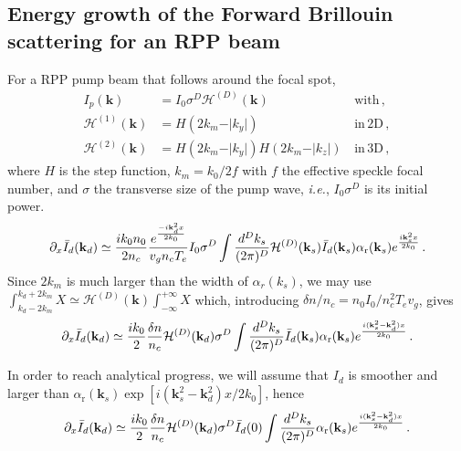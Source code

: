 \documentclass[
 reprint,
 amsmath,amssymb,
 aps,
]{revtex4-1}
\begin{document}
\begin{widetext}
 \subsection{Energy growth of the Forward Brillouin scattering for an RPP beam }
 For a RPP pump beam that follows around the focal spot, 
   \begin{align}
   I_p(\mathbf{k}) &= I_0 \sigma ^D \mathcal{H}^{(D)}(\mathbf{k})  &\,  \mathrm{with} \, ,\\ 
   \mathcal{H}^{(1)}(\mathbf{k}) &= H(2k_m - \vert k_y \vert ) &\,  \mathrm{in}\, \mathrm{2D} \, ,\\ 
    \mathcal{H}^{(2)}(\mathbf{k}) &=   H(2k_m - \vert k_y \vert ) H(2k_m - \vert k_z \vert ) &\,  \mathrm{in}\, \mathrm{3D} \, ,
   \end{align} 
     where $H$ is the step function, $k_m=k_0/2f$ with $f$ the effective speckle focal number,  and $\sigma$ the transverse size of the pump wave, \emph{i.e.}, $I_0\sigma^D$ is its initial power.
  \begin{align}
\partial_x\Bar{I}_d(\mathbf{k}_d)\simeq  \frac{ik_0n_0}{2n_c} \frac{e^{\frac{-i\mathbf{k}_d^2x}{2k_0}} }{  v_g n_c T_e}   
 I_0\sigma^D \int \frac{d^Dk_s}{(2\pi)^D}   \mathcal{H}^{(D)}(\mathbf{k}_s) \Bar{I}_d(\mathbf{k}_s) \alpha_\mathrm{r}(\mathbf{k}_s) 
e^{\frac{i\mathbf{k}_s^2x}{2k_0}} 
\, . \label{eq:g4}
\end{align}
Since $2k_m$ is much larger than the width of $\alpha_r(k_s)$, we may use $\int_{k_d-2k_m}^{k_d+2k_m} X \simeq \mathcal{H}^{(D)}(\mathbf{k}) \int_{-\infty}^{+\infty}X$
which, introducing $\delta n/n_c=n_0I_0/{n_c^2 T_ev_g}$, gives
 \begin{align}
\partial_x\Bar{I}_d(\mathbf{k}_d)\simeq  \frac{ik_0}{2}  \frac{\delta n}{n_c}
 \mathcal{H}^{(D)}(\mathbf{k}_d)\sigma^D  \int \frac{d^Dk_s}{(2\pi)^D} \Bar{I}_d(\mathbf{k}_s) \alpha_\mathrm{r}(\mathbf{k}_s) 
e^{\frac{i(\mathbf{k}_s^2-\mathbf{k}_d^2)x}{2k_0}} 
\, . \label{eq:g5}
\end{align}

In order to reach analytical progress, we will assume that $I_d$ is  smoother and larger  than $\alpha_\mathrm{r}(\mathbf{k}_s) 
\exp[i(\mathbf{k}_s^2-\mathbf{k}_d^2)x / 2k_0]$, hence 
\begin{align}
\partial_x\Bar{I}_d(\mathbf{k}_d)\simeq  \frac{ik_0}{2}  \frac{\delta n}{n_c}
 \mathcal{H}^{(D)}(\mathbf{k}_d) \sigma^D \Bar{I}_d(0) \int \frac{d^Dk_s}{(2\pi)^D}  \alpha_\mathrm{r}(\mathbf{k}_s) 
e^{\frac{i(\mathbf{k}_s^2-\mathbf{k}_d^2)x}{2k_0}} 
\, . \label{eq:g6}
\end{align}
 

\end{widetext}
\end{document}
